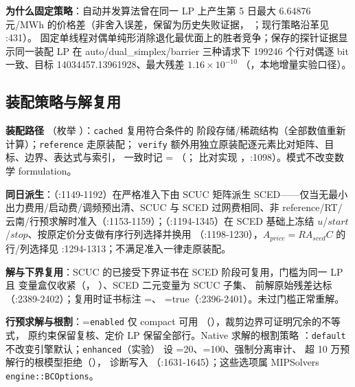 \textbf{为什么固定策略}：自动并发算法曾在同一 LP 上产生第 5 日最大
6.64876 元/MWh 的价格差（非舍入误差，保留为历史失败证据，
；现行策略沿革见 :431）。
固定单线程对偶单纯形消除退化最优面上的胜者竞争；保存的探针证据显示同一装配 LP
在 auto/dual\_simplex/barrier 三种请求下 199246 个行对偶逐 bit 一致、目标
14034457.13961928、最大残差 $1.16\times10^{-10}$
（，本地增量实验口径）。

\subsection{装配策略与解复用}
\textbf{装配路径} （枚举
）：\texttt{cached} 复用符合条件的
阶段存储/稀疏结构（全部数值重新计算）；\texttt{reference} 走原装配；
\texttt{verify} 额外用独立原装配逐元素比对矩阵、目标、边界、表达式与索引，
一致时记 =
（；
比对实现 ，:1098）。模式不改变数学 formulation。

\textbf{同日派生}：（:1149-1192）在严格准入下由 SCUC 矩阵派生
SCED——仅当无最小出力费用/启动费/调频预出清、SCUC 与 SCED 过网费相同、非
reference/RT/云南/行预求解时准入（:1153-1159）；（:1194-1345）在
SCED 基础上冻结 $u$/$start$/$stop$、按原定价分支做有序行列选择并换用
（:1198-1230），$A_{price}=RA_{sced}C$ 的行/列选择见
:1294-1313；不满足准入一律走原装配。

\textbf{解与下界复用}：SCUC 的已接受下界证书在 SCED 阶段可复用，门槛为同一 LP 且
变量盒仅收紧（，
）、SCED 二元变量为 SCUC 子集、
前解原始残差达标（:2389-2402）；复用时证书标注 =、
=true（:2396-2401）。未过门槛正常重解。

\textbf{行预求解与根割}：=\texttt{enabled} 仅 compact 可用
（），裁剪边界可证明冗余的不等式，
原约束保留复核、定价 LP 保留全部行。Native 求解的根割策略
：\texttt{default} 不改变引擎默认；\texttt{enhanced}（实验）
设 =20、=100、强制分离审计、
超 10 万预解行的根模型拒绝（），
诊断写入 （:1631-1645）；这些选项属 MIPSolvers
\texttt{engine::BCOptions}。

